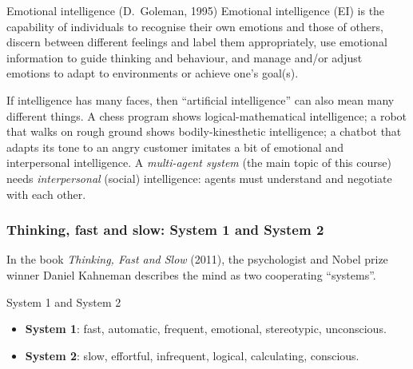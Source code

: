 \begin{nbdef}{Emotional intelligence (D.~Goleman, 1995)}
Emotional intelligence (EI) is the capability of individuals to recognise their own emotions
and those of others, discern between different feelings and label them appropriately, use
emotional information to guide thinking and behaviour, and manage and/or adjust emotions
to adapt to environments or achieve one's goal(s).
\end{nbdef}

\begin{nbintuition}
If intelligence has many faces, then ``artificial intelligence'' can also mean many
different things. A chess program shows logical-mathematical intelligence; a robot that
walks on rough ground shows bodily-kinesthetic intelligence; a chatbot that adapts its tone
to an angry customer imitates a bit of emotional and interpersonal intelligence. A
\emph{multi-agent system} (the main topic of this course) needs \emph{interpersonal}
(social) intelligence: agents must understand and negotiate with each other.
\end{nbintuition}

\subsubsection{Thinking, fast and slow: System 1 and System 2}
\label{sec:system1-system2}

In the book \emph{Thinking, Fast and Slow} (2011), the psychologist and Nobel prize winner
Daniel Kahneman describes the mind as two cooperating ``systems''.

\begin{nbdef}{System 1 and System 2}
\begin{itemize}[nosep]
  \item \textbf{System 1}: fast, automatic, frequent, emotional, stereotypic, unconscious.
  \item \textbf{System 2}: slow, effortful, infrequent, logical, calculating, conscious.
\end{itemize}
\end{nbdef}

